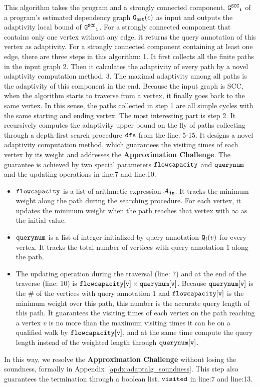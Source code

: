  This algorithm takes the program and a strongly connected component, 
 $\mathtt{\mathtt{G^{SCC}}_i}$ of a program's estimated dependency graph $\mathtt{{G_{est}}}(c)$ as input
and outputs the adaptivity local bound of $\mathtt{\mathtt{G^{SCC}}_i}$. 
For a strongly connected component that contains only one vertex without any edge, it returns the query annotation of this vertex as adaptivity.
For a strongly connected component containing at least one edge, 
there are three steps in this algorithm: 1. It first collects all the finite paths in the input graph 2. Then it calculates the adaptivity of every path by a novel adaptivity computation method. 3. The maximal adaptivity among all paths is the adaptivity of this component in the end. Because the input graph is SCC, when the algorithm starts to traverse from a vertex, it finally goes back to the same vertex.
In this sense, the paths collected in step 1 are all simple cycles with the same starting and ending vertex. 
The most interesting part is step 2. It recursively computes the adaptivity upper bound on the fly of paths collecting through a depth-first search procedure $\mathtt{dfs}$ from the line: 5-15.
It designs a novel adaptivity computation method, which guarantees the visiting times of each vertex by its weight and addresses the \textbf{Approximation Challenge}.
The guarantee is achieved by two special parameters $\mathtt{flowcapacity}$ and $\mathtt{querynum}$ and the updating operations in line:7 and line:10.
% 
\begin{itemize}
\item $\mathtt{flowcapacity}$ is a list of arithmetic expression $\mathcal{A}_{\mathtt{in}}$.
It tracks the minimum weight
along the path during the 
searching procedure. For each vertex, it updates the minimum weight when the path reaches that vertex with $\infty$ as the initial value.
\item $\mathtt{querynum}$ is a list of integer
initialized by query annotation $\mathtt{Q}_i(v)$ for every vertex. 
It tracks the total number of vertices with query annotation $1$
along the path.
\item
The updating operation
during the traversal 
(line: 7) and 
at the end of the traverse (line: 10) is
$\mathtt{flowcapacity[v] \times querynum[v]}$.
Because $\mathtt{querynum[v]}$ is the \# of the vertices with query annotation $1$ and $\mathtt{flowcapacity[v]}$ is the minimum weight over this path,
this number is the accurate query length of this path. 
It guarantees 
the visiting times of each vertex on the path reaching a vertex $v$ is no more than 
the maximum visiting times it can be on a qualified walk by $\mathtt{flowcapacity[v]}$,
and 
at the same time compute the query length instead of the weighted length through 
$\mathtt{ querynum[v]}$.
\end{itemize}
In this way, we resolve the \textbf{Approximation Challenge} without losing the soundness, formally in Appendix~\ref{apdx:adaptalg_soundness}.
This step also guarantees the termination through a boolean list, $\mathtt{visited}$ in line:7 and line:13.
 

